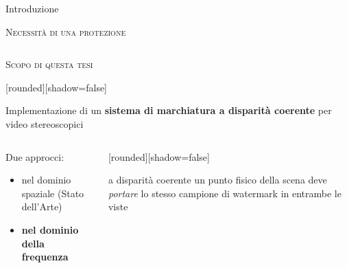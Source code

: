 \documentclass{beamer}
\begin{document}
\begin{section}{Introduzione}
\begin{frame}[t]{\textsc{Necessit\`{a} di una protezione}}
\begin{columns}[T]
\begin{column}[T]{6cm}
\end{column}
\begin{column}[T]{5cm}

\end{column}
\end{columns}

\end{frame}







\begin{frame}[t]{\textsc{Scopo di questa tesi}}
\vspace{0.5em}
\begin{center}
 [rounded][shadow=false]
 \begin{block}{}
 \center \large{Implementazione di un \textbf{sistema di marchiatura a disparit\`{a} coerente} per video stereoscopici}
 \end{block}
\end{center}
\begin{columns}[T]
\begin{column}[T]{5cm}
Due approcci:
\vspace{0.2em}
\begin{itemize}
\item nel dominio spaziale (Stato dell'Arte)\\
\item \textbf{nel dominio della frequenza} 
\end{itemize}
\end{column}
\begin{column}[T]{5cm}
\vspace{0.2em}	
[rounded][shadow=false]
\begin{block}{\small{a disparit\`{a} coerente}}
\center \small{un punto fisico della scena deve \textit{portare} lo stesso campione di watermark in entrambe le viste}
\end{block}
\end{column}
\end{columns}


\end{frame}




\end{section}
\end{document}
